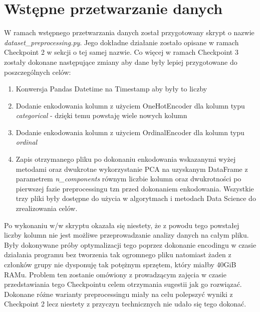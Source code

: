 \documentclass{classrep}
\begin{document}
    \section{Wstępne przetwarzanie danych} {
        W ramach wstępnego przetwarzania danych został przygotowany skrypt o nazwie
        \textit{dataset\_preprocessing.py}. Jego dokładne działanie zostało opisane w
        ramach Checkpoint 2 w sekcji o tej samej nazwie. Co więcej w ramach Checkpoint
        3 zostały dokonane następujące zmiany aby dane były lepiej przygotowane do
        poszczególnych celów:
        \begin{enumerate}
            \item Konwersja Pandas Datetime na Timestamp aby były to liczby
            \item Dodanie enkodowania kolumn z użyciem OneHotEncoder dla kolumn typu \emph{categorical} -
            dzięki temu powstaję wiele nowych kolumn
            \item Dodanie enkodowania kolumn z użyciem OrdinalEncoder dla kolumn typu \emph{ordinal}
            \item Zapis otrzymanego pliku po dokonaniu enkodowania wskazanymi wyżej metodami oraz dwukrotne
            wykorzystanie PCA na uzyskanym DataFrame z parametrem \emph{n\_components} równym liczbie
            kolumn oraz dwukrotności po pierwszej fazie preprocessingu tzn przed dokonaniem
            enkodowania. Wszystkie trzy pliki były dostępne do użycia w algorytmach i metodach Data
            Science do zrealizowania celów.
        \end{enumerate}
        Po wykonaniu w/w skryptu okazała się niestety, że z powodu tego powstałej
        liczby kolumn nie jest możliwe przeprowadzanie analizy danych na całym pliku.
        Były dokonywane próby optymalizacji tego poprzez dokonanie encodingu w czasie
        działania programu bez tworzenia tak ogromnego pliku natomiast żaden z członków
        grupy nie dysponuję tak potężnym sprzętem, który miałby 40GiB RAMu. Problem ten
        zostanie omówiony z prowadzącym zajęcia w czasie przedstawiania tego
        Checkpointu celem otrzymania sugestii jak go rozwiązać. Dokonane różne warianty
        preprocessingu miały na celu polepszyć wyniki z Checkpoint 2 lecz niestety z
        przyczyn technicznych nie udało się tego dokonać.
    }
\end{document}

